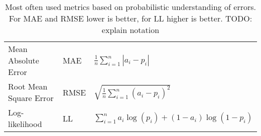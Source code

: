 




\begin{table}
  \centering
  \caption{Most often used metrics based on probabilistic understanding of
    errors. For MAE and RMSE lower is better, for LL higher is better.
    TODO: explain notation}
  \label{tab:metrics}
  \begin{tabular}{lll}
    \toprule
    Mean Absolute Error & MAE & $\frac{1}{n} \sum_{i=1}^n |a_i - p_i|$ \\
    Root Mean Square Error & RMSE & $\sqrt{\frac{1}{n} \sum_{i=1}^n (a_i -
      p_i)^2}$ \\
    Log-likelihood & LL & $\sum_{i=1}^n a_i\log(p_i) + (1-a_i)\log(1-p_i)$ \\
    \bottomrule
  \end{tabular}
\end{table}


